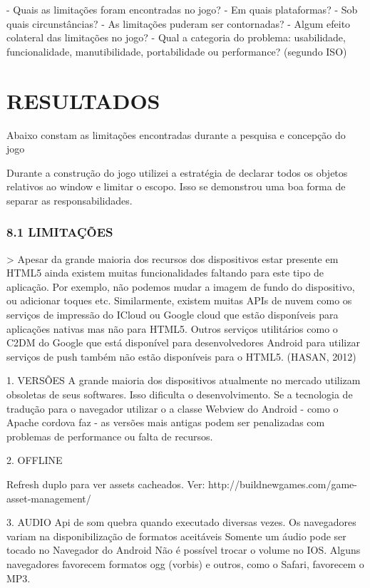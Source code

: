 \documentclass[11pt,a4paper]{article}
\begin{document}
- Quais as limitações foram encontradas no jogo?
- Em quais plataformas?
- Sob quais circunstâncias?
- As limitações puderam ser contornadas?
- Algum efeito colateral das limitações no jogo?
- Qual a categoria do problema: usabilidade, funcionalidade, manutibilidade, portabilidade ou performance? (segundo ISO)


\chapter{RESULTADOS}

Abaixo constam as limitações encontradas durante a pesquisa e concepção do jogo

Durante a construção do jogo utilizei a estratégia de declarar todos os objetos relativos ao window e limitar o escopo. Isso se demonstrou uma boa forma de separar as responsabilidades.

\subsection{8.1  LIMITAÇÕES}

> Apesar da grande maioria dos recursos dos dispositivos estar presente em HTML5 ainda existem muitas funcionalidades faltando para este tipo de aplicação. Por exemplo, não podemos mudar a imagem de fundo do dispositivo, ou adicionar toques etc. Similarmente, existem muitas APIs de nuvem como os serviços de impressão do ICloud ou Google cloud que estão disponíveis para aplicações nativas mas não para HTML5. Outros serviços utilitários como o C2DM do Google que está disponível para desenvolvedores Android para utilizar serviços de push também não estão disponíveis para o HTML5. (HASAN, 2012)

1.  VERSÕES
A grande maioria dos dispositivos atualmente no mercado utilizam obsoletas de seus softwares. Isso dificulta o desenvolvimento. Se a tecnologia de tradução para o navegador utilizar o a classe Webview do Android - como o Apache cordova faz - as versões mais antigas podem ser penalizadas com problemas de performance ou falta de recursos.

2. OFFLINE

Refresh duplo para ver assets cacheados. Ver: http://buildnewgames.com/game-asset-management/

3. AUDIO
Api de som quebra quando executado diversas vezes.
Os navegadores variam na disponibilização de formatos aceitáveis
Somente um áudio pode ser tocado no Navegador do Android
Não é possível trocar o volume no IOS.
Alguns navegadores favorecem formatos ogg (vorbis) e outros, como o Safari, favorecem o MP3.
\end{document}
